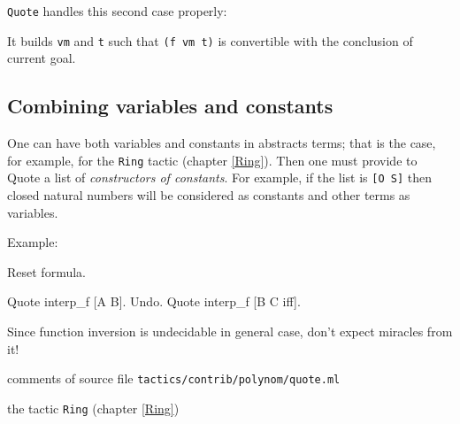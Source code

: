 \noindent\texttt{Quote} handles this second case properly:


It builds \texttt{vm} and \texttt{t} such that \texttt{(f vm t)} is
convertible with the conclusion of current goal.

\subsection{Combining variables and constants}

One can have both variables and constants in abstracts terms; that is
the case, for example, for the \texttt{Ring} tactic (chapter
\ref{Ring}). Then one must provide to Quote a list of
\emph{constructors of constants}. For example, if the list is
\texttt{[O S]} then closed natural numbers will be considered as
constants and other terms as variables. 

Example: 

\begin{coq_eval}
Reset formula.
\end{coq_eval}

\begin{coq_example}
Quote interp_f [A B]. 
Undo. Quote interp_f [B C iff]. 
\end{coq_example}

\Warning Since function inversion
is undecidable in general case, don't expect miracles from it!


\SeeAlso comments of source file \texttt{tactics/contrib/polynom/quote.ml}

\SeeAlso the tactic \texttt{Ring} (chapter \ref{Ring})


